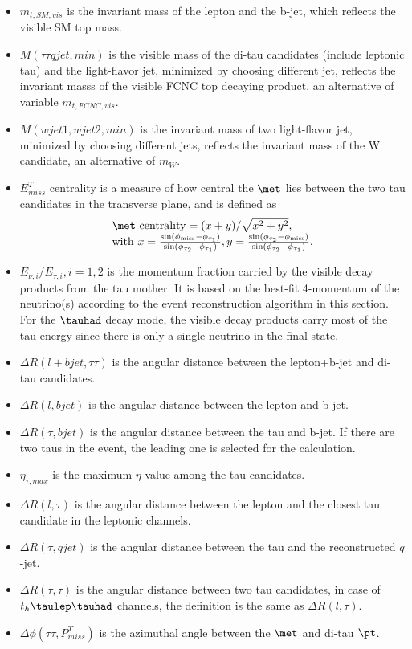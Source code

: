 \begin{itemize}
\item $m_{t,SM,vis}$ is the invariant mass of the lepton and the b-jet, which reflects the visible SM top mass.
\item $M(\tau\tau qjet,min)$ is the visible mass of the di-tau candidates (include leptonic tau) and the light-flavor jet, minimized by choosing different jet, reflects the invariant masss of the visible FCNC top decaying product, an alternative of variable $m_{t,FCNC,vis}$.
\item $M(wjet1,wjet2,min)$ is the invariant mass of two light-flavor jet, minimized by choosing different jets, reflects the invariant mass of the W candidate, an alternative of $m_{W}$.
\item $E^{T}_{miss}$ centrality is a measure of how central the $\met$ lies between the two tau candidates in the transverse plane, and is defined as
\begin{eqnarray}
\begin{array}{l}
\met~\text{centrality} = {(x+y)}/{\sqrt{x^2+y^2}}, \\
\text{with}~x=\frac{\sin(\phi_{\text{miss}}-\phi_{\tau_1})}{\sin(\phi_{\tau_2}-\phi_{\tau_1})},  y=\frac{\sin(\phi_{\tau_2}-\phi_{\text{miss}})}{\sin(\phi_{\tau_2}-\phi_{\tau_1})} ,
\end{array}
\label{eq:eq3}
\end{eqnarray}
\item $E_{\nu,i}/E_{\tau,i},i=1,2$ is the momentum fraction carried by the visible decay products from the tau mother. It is based on the best-fit 4-momentum of the neutrino(s) according to the event reconstruction algorithm in this section. For the $\tauhad$ decay mode, the visible decay products carry most of the tau energy since there is only a single neutrino in the final state.%
\item $\Delta R(l+bjet,\tau\tau)$ is the angular distance between the lepton+b-jet and di-tau candidates.
\item $\Delta R(l,bjet)$ is the angular distance between the lepton and b-jet.
\item $\Delta R(\tau,bjet)$ is the angular distance between the tau and b-jet. If there are two taus in the event, the leading one is selected for the calculation.
\item $\eta_{\tau,max}$ is the maximum $\eta$ value among the tau candidates.
\item $\Delta R(l,\tau)$ is the angular distance between the lepton and the closest tau candidate in the leptonic channels.
\item $\Delta R(\tau,qjet)$ is the angular distance between the tau and the reconstructed $q$-jet.
\item $\Delta R(\tau,\tau)$ is the angular distance between two tau candidates, in case of $t_h\tlhad$ channels, the definition is the same as $\Delta R(l,\tau)$.
\item $\Delta\phi(\tau\tau,P^{T}_{miss})$ is the azimuthal angle between the $\met$ and di-tau $\pt$.
\end{itemize}
